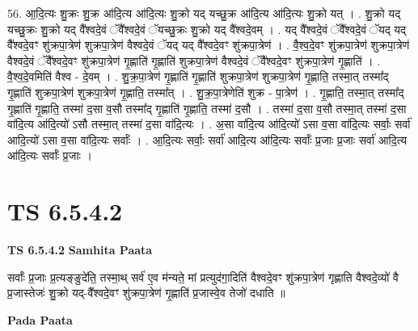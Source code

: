 \documentclass[17pt]{extarticle}
\begin{document}
56. आ॒दि॒त्यः शु॒क्रः शु॒क्र आ॑दि॒त्य आ॑दि॒त्यः शु॒क्रो यद् यच्छु॒क्र आ॑दि॒त्य आ॑दि॒त्यः शु॒क्रो यत् । . शु॒क्रो यद् यच्छु॒क्रः शु॒क्रो यद् वै᳚श्वदे॒वं ॅवै᳚श्वदे॒वं ॅयच्छु॒क्रः शु॒क्रो यद् वै᳚श्वदे॒वम् । . यद् वै᳚श्वदे॒वं ॅवै᳚श्वदे॒वं ॅयद् यद् वै᳚श्वदे॒वꣳ शु॑क्रपा॒त्रेण॑ शुक्रपा॒त्रेण॑ वैश्वदे॒वं ॅयद् यद् वै᳚श्वदे॒वꣳ शु॑क्रपा॒त्रेण॑ । . वै॒श्व॒दे॒वꣳ शु॑क्रपा॒त्रेण॑ शुक्रपा॒त्रेण॑ वैश्वदे॒वं ॅवै᳚श्वदे॒वꣳ शु॑क्रपा॒त्रेण॑ गृ॒ह्णाति॑ गृ॒ह्णाति॑ शुक्रपा॒त्रेण॑ वैश्वदे॒वं ॅवै᳚श्वदे॒वꣳ शु॑क्रपा॒त्रेण॑ गृ॒ह्णाति॑ । . वै॒श्व॒दे॒वमिति॑ वैश्व - दे॒वम् । . शु॒क्र॒पा॒त्रेण॑ गृ॒ह्णाति॑ गृ॒ह्णाति॑ शुक्रपा॒त्रेण॑ शुक्रपा॒त्रेण॑ गृ॒ह्णाति॒ तस्मा॒त् तस्मा᳚द् गृ॒ह्णाति॑ शुक्रपा॒त्रेण॑ शुक्रपा॒त्रेण॑ गृ॒ह्णाति॒ तस्मा᳚त् । . शु॒क्र॒पा॒त्रेणेति॑ शुक्र - पा॒त्रेण॑ । . गृ॒ह्णाति॒ तस्मा॒त् तस्मा᳚द् गृ॒ह्णाति॑ गृ॒ह्णाति॒ तस्मा॑ द॒सा व॒सौ तस्मा᳚द् गृ॒ह्णाति॑ गृ॒ह्णाति॒ तस्मा॑ द॒सौ । . तस्मा॑ द॒सा व॒सौ तस्मा॒त् तस्मा॑ द॒सा वा॑दि॒त्य आ॑दि॒त्यो॑ ऽसौ तस्मा॒त् तस्मा॑ द॒सा वा॑दि॒त्यः । . अ॒सा वा॑दि॒त्य आ॑दि॒त्यो॑ ऽसा व॒सा वा॑दि॒त्यः सर्वाः॒ सर्वा॑ आदि॒त्यो॑ ऽसा व॒सा वा॑दि॒त्यः सर्वाः᳚ । . आ॒दि॒त्यः सर्वाः॒ सर्वा॑ आदि॒त्य आ॑दि॒त्यः सर्वाः᳚ प्र॒जाः प्र॒जाः सर्वा॑ आदि॒त्य आ॑दि॒त्यः सर्वाः᳚ प्र॒जाः । \newline
\pagebreak
{}

\section{ TS 6.5.4.2 }

\textbf{TS 6.5.4.2 } \newline
\textbf{Samhita Paata} \newline

सर्वाः᳚ प्र॒जाः प्र॒त्यङ्ङुदे॑ति॒ तस्मा॒थ् सर्व॑ ए॒व म॑न्यते॒ मां प्रत्युद॑गा॒दिति॑ वैश्वदे॒वꣳ शु॑क्रपा॒त्रेण॑ गृह्णाति वैश्वदे॒व्यो॑ वै प्र॒जास्तेजः॑ शु॒क्रो यद्-वै᳚श्वदे॒वꣳ शु॑क्रपा॒त्रेण॑ गृ॒ह्णाति॑ प्र॒जास्वे॒व तेजो॑ दधाति ॥ \newline

\textbf{Pada Paata} \newline
\end{document}
